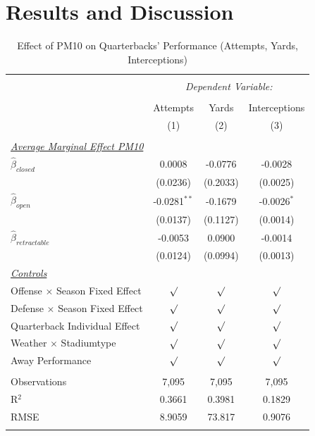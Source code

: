 \documentclass[12pt,a4paper]{article}
\begin{document}
{\clearpage \section{Results and Discussion}
\begin{table}[!htbp] \centering 
  \caption{Effect of PM10 on Quarterbacks' Performance (Attempts, Yards, Interceptions)} 
  \label{T2} 
\begin{tabular}{@{\extracolsep{5pt}}lccc} 
\\[-1.8ex]\hline 
\hline \\[-1.8ex] 
 & \multicolumn{3}{c}{\textit{Dependent Variable:}} \\ \cline{2-4} \\ [-1.8ex]
 & Attempts & Yards & Interceptions \\ 
  & (1) & (2) & (3)\\ \hline \\[-1.8ex] 
 \underline{\textit{Average Marginal Effect PM10}}\\[0.4cm]
  $\hat{\beta}_{closed}$& 0.0008 & -0.0776 & -0.0028 \\ 
  & (0.0236)  & (0.2033)& (0.0025) \\[0.4cm]
  $\hat{\beta}_{open}$& -0.0281$^{**}$ & -0.1679 & -0.0026$^{*}$\\ 
  & (0.0137) & (0.1127) & (0.0014) \\[0.4cm]
  $\hat{\beta}_{retractable}$& -0.0053 & 0.0900 & -0.0014 \\ 
  & (0.0124) & (0.0994) & (0.0013)\\ [0.4cm]
  \underline{\textit{Controls}} \\[0.4cm]
  Offense $\times$ Season Fixed Effect & $\surd$ & $\surd$ & $\surd$ \\[0.4cm]
   Defense $\times$ Season Fixed Effect & $\surd$ & $\surd$  & $\surd$ \\[0.4cm]
    Quarterback Individual Effect & $\surd$ & $\surd$ & $\surd$  \\[0.4cm]
    Weather $\times $ Stadiumtype & $\surd$ & $\surd$ & $\surd$ \\[0.4cm]
    Away Performance & $\surd$ & $\surd$ & $\surd$\\
\hline \\[-1.8ex] 
Observations & 7,095 & 7,095 & 7,095 \\ 
R$^{2}$ & 0.3661 &  0.3981 & 0.1829\\ 
RMSE & 8.9059 & 73.817 & 0.9076\\ \hline 
\hline \\[-1.8ex] 

\end{tabular}
\end{table}}
\end{document}
